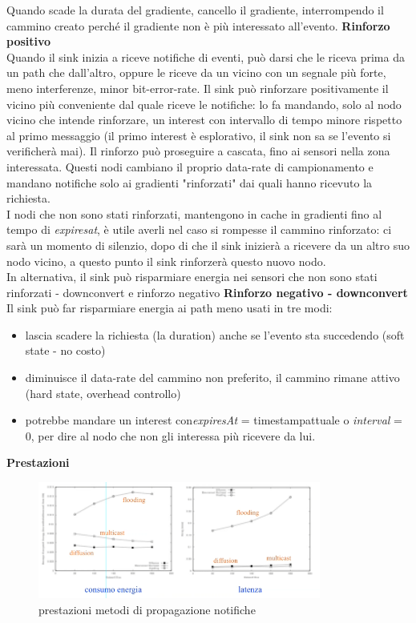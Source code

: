 \documentclass[12pt,italian]{report}
\begin{document}
Quando scade la durata del gradiente, cancello il gradiente, interrompendo il cammino creato perché il gradiente non è più interessato all'evento. 
\bigbreak
\noindent \textbf{Rinforzo positivo} \\
Quando il sink inizia a riceve notifiche di eventi, può darsi che le riceva prima da un path che dall'altro, oppure le riceve da un vicino con un segnale più forte, meno interferenze, minor bit-error-rate. Il sink può rinforzare positivamente il vicino più conveniente dal quale riceve le notifiche: lo fa mandando, solo al nodo vicino che intende rinforzare, un interest con intervallo di tempo minore rispetto al primo messaggio (il primo interest è esplorativo, il sink non sa se l'evento si verificherà mai). Il rinforzo può proseguire a cascata, fino ai sensori nella zona interessata. Questi nodi cambiano il proprio data-rate di campionamento e mandano notifiche solo ai gradienti "rinforzati" dai quali hanno ricevuto la richiesta. \\ I nodi che non sono stati rinforzati, mantengono in cache in gradienti fino al tempo di \textit{expiresat}, è utile averli nel caso si rompesse il cammino rinforzato: ci sarà un momento di silenzio, dopo di che il sink inizierà a ricevere da un altro suo nodo vicino, a questo punto il sink rinforzerà questo nuovo nodo. \\ In alternativa, il sink può risparmiare energia nei sensori che non sono stati rinforzati - downconvert e rinforzo negativo
\bigbreak
\noindent \textbf{Rinforzo negativo - downconvert} \\
Il sink può far risparmiare energia ai path meno usati in tre modi:
\begin{itemize}
    \item lascia scadere la richiesta (la duration) anche se l'evento sta succedendo (soft state - no costo)
    \item diminuisce il data-rate del cammino non preferito, il cammino rimane attivo (hard state, overhead controllo)
    \item potrebbe mandare un interest con\textit{expiresAt} = timestampattuale o \textit{interval} = 0, per dire al nodo che non gli interessa più ricevere da lui. 
\end{itemize}
\bigbreak
\noindent \textbf{Prestazioni} \\
\begin{figure}[h]
\centering
\includegraphics[width=93mm]{img/prestazion.PNG}
\caption{prestazioni metodi di propagazione notifiche}
\label{fig:pres}
\end{figure}
\end{document}
